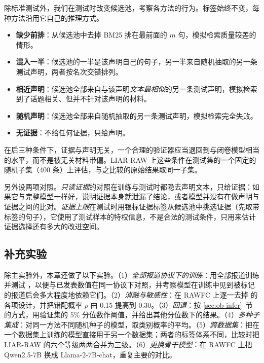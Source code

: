 除标准测试外，我们在测试时改变候选池，考察各方法的行为。标签始终不变，每种方法沿用它自己的推理方式。
\begin{itemize}
\item \textbf{缺少前排}：从候选池中去掉 BM25 排在最前面的 $m$ 句，模拟检索质量较差的情形。
\item \textbf{混入一半}：候选池的一半是该声明自己的句子，另一半来自随机抽取的另一条测试声明，两者按名次交错排列。
\item \textbf{相近声明}：候选池全部来自与该声明\emph{文本最相似}的另一条测试声明，模拟检索到了话题相关、但并不针对该声明的材料。
\item \textbf{随机声明}：候选池全部来自随机抽取的另一条测试声明，模拟检索完全失败。
\item \textbf{无证据}：不给任何证据，只给声明。
\end{itemize}
在后三种条件下，证据与声明无关，一个合理的验证器应当退回到与闭卷模型相当的水平，而不是被无关材料带偏。LIAR-RAW 上这些条件在测试集的一个固定的随机子集（400 条）上评估，与之比较的原始结果取同一子集。

另外设两项对照。\emph{只读证据}的对照在训练与测试时都隐去声明文本，只给证据：如果它与完整模型一样好，说明证据本身就泄漏了结论，或者模型并没有在做声明与证据之间的比对\citep{hansen2021reason}。\emph{证据上限}在测试时用银标证据标签从候选池中挑选证据（先取带标签的句子），它使用了测试样本的特权信息，不是合法的测试条件，只用来估计证据选择还有多大的改进空间。

\subsection{补充实验}

除主实验外，本章还做了以下实验。（1）\emph{全部报道协议下的训练}：用全部报道训练并测试 \ours{}，以便与已发表数值在同一协议下对照，并考察模型在训练中见到被标记的报道后会多大程度地依赖它们。（2）\emph{消融与敏感性}：在 RAWFC 上逐一去掉 \ours{} 的各项设计，并把错配概率 $\rho$ 由 0.15 提高到 0.30。（3）\emph{回退}：按 \ref{sec:ob-infer}~节的方式，用验证集的 5\% 分位数作阈值，并给出其他分位数下的结果。（4）\emph{多种子集成}：对同一方法不同随机种子的模型，取类别概率的平均。（5）\emph{跨数据集}：把在一个数据集上训练的模型直接用于另一个数据集；两者的标签体系不同，比较时把 LIAR-RAW 的六个等级两两合并为三级。（6）\emph{更换骨干模型}：在 RAWFC 上把 Qwen2.5-7B 换成 Llama-2-7B-chat，重复主要的对比。


